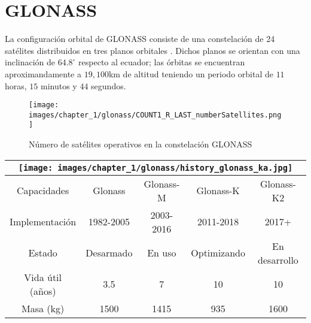 \section{GLONASS}
\label{sec:glonass}

\begin{justify}
    La configuración orbital de GLONASS consiste de una constelación de 24 satélites distribuidos en tres planos orbitales \parencite{glonass_iac}.
    Dichos planos se orientan con una inclinación de $64.8^\circ$ respecto al ecuador; las órbitas se encuentran aproximandamente
    a $19,100$km de altitud teniendo un periodo orbital de $11$ horas, $15$ minutos y $44$ segundos.

    \begin{figure}[H]
        \centering
        \texttt{[image: images/chapter\_1/glonass/COUNT1\_R\_LAST\_numberSatellites.png]}
        \caption{Número de satélites operativos en la constelación GLONASS}
        \label{fig:glonass_numSatellites}
    \end{figure}

    \begin{table}[H]
        \centering
        \renewcommand{\arraystretch}{1.5}
        \setlength{\tabcolsep}{5pt}
        \begin{tabular}{|c|c|c|c|c|}
            \hline
            \multicolumn{5}{|c|}{
                \texttt{[image: images/chapter\_1/glonass/history\_glonass\_ka.jpg]}
            } \\
            \hline
            Capacidades & Glonass & Glonass-M & Glonass-K & Glonass-K2 \\
            \hline
            Implementación & 1982-2005 & 2003-2016 & 2011-2018 & 2017+ \\
            \hline
            Estado & Desarmado & En uso & Optimizando & En desarrollo \\
            \hline
            Vida útil (años) & 3.5 & 7 & 10 & 10 \\
            \hline
            Masa (kg) & 1500 & 1415 & 935 & 1600 \\
        \end{tabular}
    \end{table}
\end{justify}